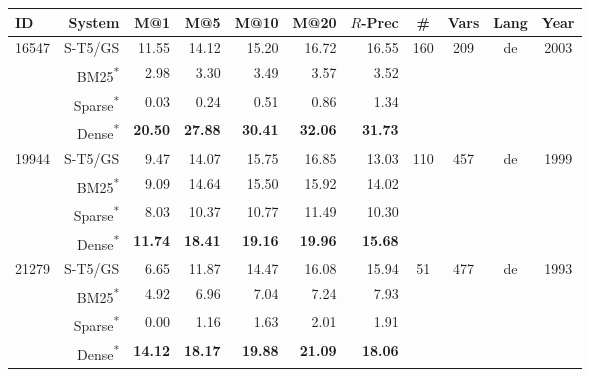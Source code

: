 \documentclass[11pt]{article}
\begin{document}
\begin{table*}[]
    \centering
    \begin{tabular}{l|r|r|r|r|r|r|c|c|c|c}
     ID &  System &  M@1 &  M@5 &  M@10 &  M@20 &  $R$-Prec &  \# & Vars & Lang &  Year \\
    \hline
    \hline
    \multirow{4}{3em}{16547} &    S-T5/GS &  11.55 &  14.12 &   15.20 &   16.72 &        16.55 &      \multirow{4}{2em}{160} &    \multirow{4}{1em}{209} &        \multirow{4}{1em}{de} &           \multirow{4}{2em}{2003} \\
     &    BM25\textsuperscript{*} &   2.98 &   3.30 &    3.49 &    3.57 &         3.52 &       &     &         &           \\
     &    Sparse\textsuperscript{*} &   0.03 &   0.24 &    0.51 &    0.86 &         1.34 &       &     &         &             \\
     &    Dense\textsuperscript{*} &  \textbf{20.50} &  \textbf{27.88} &   \textbf{30.41} &   \textbf{32.06} &        \textbf{31.73} &       &             &           \\
    \hline
    \multirow{4}{3em}{19944} &    S-T5/GS &   9.47 &  14.07 &   15.75 &   16.85 &        13.03 &      \multirow{4}{2em}{110} &    \multirow{4}{1em}{457} &        \multirow{4}{1em}{de} &            \multirow{4}{2em}{1999} \\
     &    BM25\textsuperscript{*} &   9.09 &  14.64 &   15.50 &   15.92 &        14.02 &       &     &         &           \\
     &    Sparse\textsuperscript{*} &   8.03 &  10.37 &   10.77 &   11.49 &        10.30 &       &     &         &           \\
     &    Dense\textsuperscript{*} &  \textbf{11.74} &  \textbf{18.41} &   \textbf{19.16} &   \textbf{19.96} &        \textbf{15.68} &       &     &         &           \\
    \hline
    \multirow{4}{3em}{21279} &    S-T5/GS &   6.65 &  11.87 &   14.47 &   16.08 &        15.94 &       \multirow{4}{2em}{51} &    \multirow{4}{1em}{477} &        \multirow{4}{1em}{de} &            \multirow{4}{2em}{1993} \\
     &    BM25\textsuperscript{*} &   4.92 &   6.96 &    7.04 &    7.24 &         7.93 &        &     &         &           \\
     &    Sparse\textsuperscript{*} &   0.00 &   1.16 &    1.63 &    2.01 &         1.91 &        &     &         &           \\
     &    Dense\textsuperscript{*} &  \textbf{14.12} &  \textbf{18.17} &   \textbf{19.88} &   \textbf{21.09} &        \textbf{18.06} &        &     &         &           \\

\end{tabular}
\end{table*}
\end{document}
